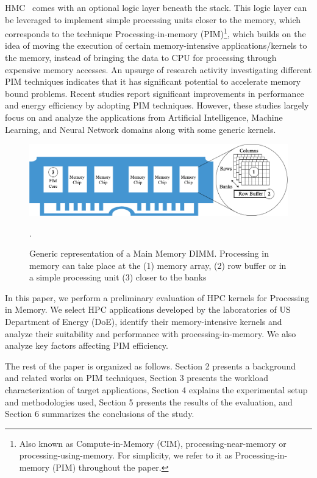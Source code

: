 HMC~\cite{hmc} comes with an optional logic layer beneath the stack. This logic layer can be leveraged to implement simple processing units closer to the memory, which corresponds to the technique Processing-in-memory (PIM)\footnote{Also known as Compute-in-Memory (CIM), processing-near-memory or processing-using-memory. For simplicity, we refer to it as Processing-in-memory (PIM) throughout the paper.}, which builds on the idea of moving the execution of certain memory-intensive applications/kernels to the memory, instead of bringing the data to CPU for processing through expensive memory accesses. An upsurge of research activity investigating different PIM techniques indicates that it has significant potential to accelerate memory bound problems. Recent studies report significant improvements in performance and energy efficiency by adopting PIM techniques. However, these studies largely focus on and analyze the applications from Artificial Intelligence, Machine Learning, and Neural Network domains along with some generic kernels. 

\begin{figure}[t!]
\centering
\includegraphics[width=.8\linewidth]{MEMSYS22/figures/pimcat.png}
\caption{Generic representation of a Main Memory DIMM. Processing in memory can take place at the (1) memory array, (2) row buffer or in a simple processing unit (3) closer to the banks}.
\label{fig:pimcat}
\end{figure}   

In this paper, we perform a preliminary evaluation of HPC kernels for Processing in Memory. We select HPC applications developed by the laboratories of US Department of Energy (DoE), identify their memory-intensive kernels and analyze their suitability and performance with processing-in-memory. We also analyze key factors affecting PIM efficiency.  

The rest of the paper is organized as follows. Section 2 presents a background and related works on PIM techniques, Section 3 presents the workload characterization of target applications, Section 4 explains the experimental setup and methodologies used, Section 5 presents the results of the evaluation, and Section 6 summarizes the conclusions of the study.   


